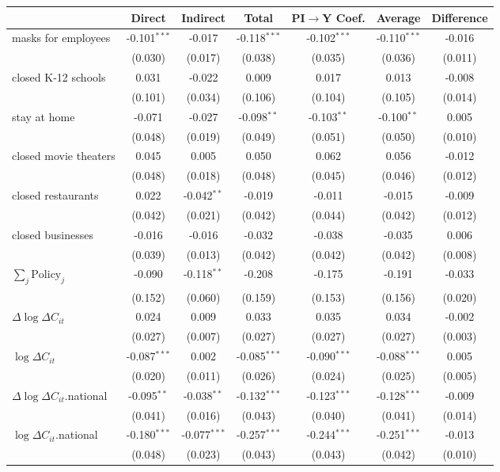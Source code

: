 
\begin{tabular}{lccccc|>{}c}
\toprule
  & Direct & Indirect & Total & PI$\to$Y Coef. & Average & Difference\\
\midrule
masks for employees & -0.101$^{***}$ & -0.017 & -0.118$^{***}$ & -0.102$^{***}$ & -0.110$^{***}$ & -0.016\\
 & (0.030) & (0.017) & (0.038) & (0.035) & (0.036) & (0.011)\\
closed K-12 schools & 0.031 & -0.022 & 0.009 & 0.017 & 0.013 & -0.008\\
 & (0.101) & (0.034) & (0.106) & (0.104) & (0.105) & (0.014)\\
stay at home & -0.071 & -0.027 & -0.098$^{**}$ & -0.103$^{**}$ & -0.100$^{**}$ & 0.005\\
 & (0.048) & (0.019) & (0.049) & (0.051) & (0.050) & (0.010)\\
closed movie theaters & 0.045 & 0.005 & 0.050 & 0.062 & 0.056 & -0.012\\
 & (0.048) & (0.018) & (0.048) & (0.045) & (0.046) & (0.012)\\
closed restaurants & 0.022 & -0.042$^{**}$ & -0.019 & -0.011 & -0.015 & -0.009\\
 & (0.042) & (0.021) & (0.042) & (0.044) & (0.042) & (0.012)\\
closed businesses & -0.016 & -0.016 & -0.032 & -0.038 & -0.035 & 0.006\\
 & (0.039) & (0.013) & (0.042) & (0.042) & (0.042) & (0.008)\\
$\sum_j \mathrm{Policy}_j$ & -0.090 & -0.118$^{**}$ & -0.208 & -0.175 & -0.191 & -0.033\\
 & (0.152) & (0.060) & (0.159) & (0.153) & (0.156) & (0.020)\\
$\Delta \log \Delta C_{it}$ & 0.024 & 0.009 & 0.033 & 0.035 & 0.034 & -0.002\\
 & (0.027) & (0.007) & (0.027) & (0.027) & (0.027) & (0.003)\\
$\log \Delta C_{it}$ & -0.087$^{***}$ & 0.002 & -0.085$^{***}$ & -0.090$^{***}$ & -0.088$^{***}$ & 0.005\\
 & (0.020) & (0.011) & (0.026) & (0.024) & (0.025) & (0.005)\\
$\Delta \log \Delta C_{it}$.national & -0.095$^{**}$ & -0.038$^{**}$ & -0.132$^{***}$ & -0.123$^{***}$ & -0.128$^{***}$ & -0.009\\
 & (0.041) & (0.016) & (0.043) & (0.040) & (0.041) & (0.014)\\
$\log \Delta C_{it}$.national & -0.180$^{***}$ & -0.077$^{***}$ & -0.257$^{***}$ & -0.244$^{***}$ & -0.251$^{***}$ & -0.013\\
 & (0.048) & (0.023) & (0.043) & (0.043) & (0.042) & (0.010)\\
\bottomrule
\end{tabular}